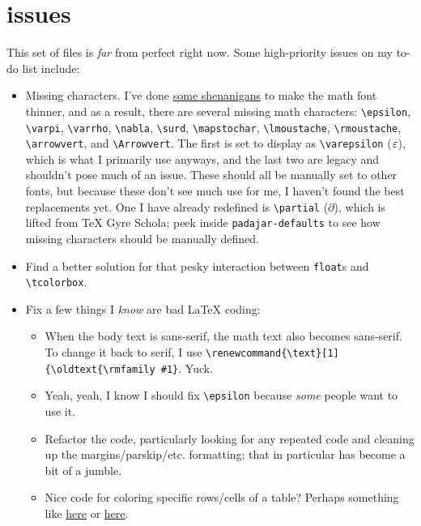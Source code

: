 \documentclass[11pt]{padajar-memo}
\newcommand{\ttslash}[1]{\texttt{\textbackslash #1}}
\begin{document}
\section{issues}

This set of files is \textit{far} from perfect right now. Some high-priority issues on my to-do list include:

\begin{itemize}
	\item Missing characters. I've done \href{https://tex.stackexchange.com/questions/739639/making-ibm-plex-math-thinner/}{some shenanigans} to make the math font thinner, and as a result, there are several missing math characters: \ttslash{epsilon}, \ttslash{varpi}, \ttslash{varrho}, \ttslash{nabla}, \ttslash{surd}, \ttslash{mapstochar}, \ttslash{lmoustache}, \ttslash{rmoustache}, \ttslash{arrowvert}, and \ttslash{Arrowvert}. The first is set to display as \ttslash{varepsilon} ($\varepsilon$), which is what I primarily use anyways, and the last two are legacy and shouldn't pose much of an issue. These should all be manually set to other fonts, but because these don't see much use for me, I haven't found the best replacements yet. One I have already redefined is \ttslash{partial} ($\partial$), which is lifted from \TeX{} Gyre Schola; peek inside \texttt{padajar-defaults} to see how missing characters should be manually defined.
	\item Find a better solution for that pesky interaction between \texttt{float}s and \ttslash{tcolorbox}.
	\item Fix a few things I \textit{know} are bad \LaTeX{} coding:
	\begin{itemize}
		\item When the body text is sans-serif, the math text also becomes sans-serif. To change it back to serif, I use \ttslash{renewcommand\{\textbackslash text\}[1]\{\textbackslash oldtext\{\textbackslash rmfamily \#1\}}. Yuck.
		\item Yeah, yeah, I know I should fix \ttslash{epsilon} because \emph{some} people want to use it.
		\item Refactor the code, particularly looking for any repeated code and cleaning up the margins/parskip/etc. formatting; that in particular has become a bit of a jumble.
		\item Nice code for coloring specific rows/cells of a table? Perhaps something like \href{https://tex.stackexchange.com/questions/213301/efficiently-colouring-block-of-table-cells}{here} or \href{https://tex.stackexchange.com/questions/740514/changing-cell-text-color-for-a-table-included-with-input}{here}.
	\end{itemize}
\end{itemize}
\end{document}
